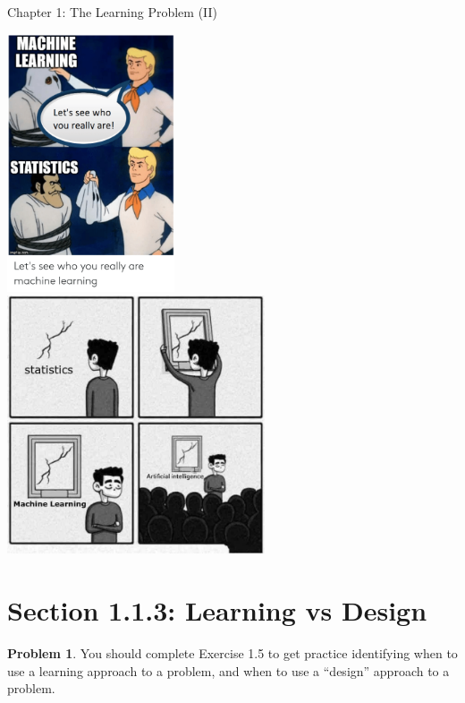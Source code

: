 \documentclass[10pt]{exam}
\theoremstyle{definition}
\newtheorem{problem}{Problem}
\begin{document}
\begin{center}
{
\Huge
Chapter 1: The Learning Problem (II)
}
\end{center}

\begin{center}
\includegraphics[height=3in]{scooby}
~~~~~~~~~~
\includegraphics[height=3in]{ml}
\end{center}

\section{Section 1.1.3: Learning vs Design}

\begin{problem}
You should complete Exercise 1.5 to get practice identifying when to use a learning approach to a problem, and when to use a ``design'' approach to a problem.
\end{problem}

%
%
\end{document}
